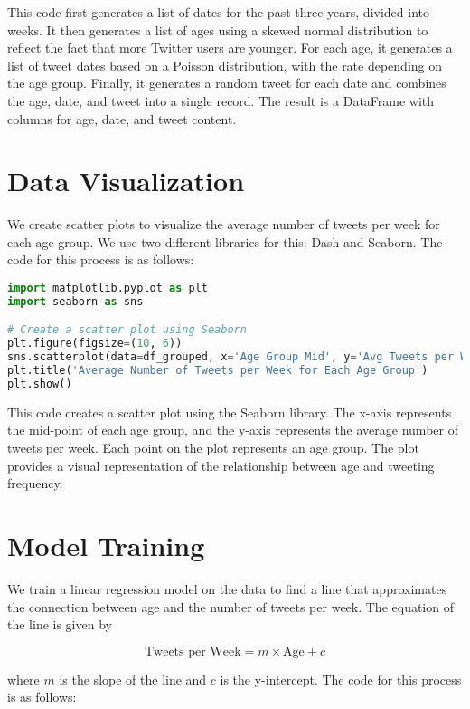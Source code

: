 \documentclass{article}
\begin{document}
This code first generates a list of dates for the past three years, divided into weeks. It then generates a list of ages using a skewed normal distribution to reflect the fact that more Twitter users are younger. For each age, it generates a list of tweet dates based on a Poisson distribution, with the rate depending on the age group. Finally, it generates a random tweet for each date and combines the age, date, and tweet into a single record. The result is a DataFrame with columns for age, date, and tweet content.

\section{Data Visualization}

We create scatter plots to visualize the average number of tweets per week for each age group. We use two different libraries for this: Dash and Seaborn. The code for this process is as follows:

\begin{lstlisting}[language=Python]
import matplotlib.pyplot as plt
import seaborn as sns

# Create a scatter plot using Seaborn
plt.figure(figsize=(10, 6))
sns.scatterplot(data=df_grouped, x='Age Group Mid', y='Avg Tweets per Week')
plt.title('Average Number of Tweets per Week for Each Age Group')
plt.show()
\end{lstlisting}

This code creates a scatter plot using the Seaborn library. The x-axis represents the mid-point of each age group, and the y-axis represents the average number of tweets per week. Each point on the plot represents an age group. The plot provides a visual representation of the relationship between age and tweeting frequency.

\section{Model Training}

We train a linear regression model on the data to find a line that approximates the connection between age and the number of tweets per week. The equation of the line is given by

\begin{equation}
\text{Tweets per Week} = m \times \text{Age} + c
\end{equation}

where $m$ is the slope of the line and $c$ is the y-intercept. The code for this process is as follows:
\end{document}
